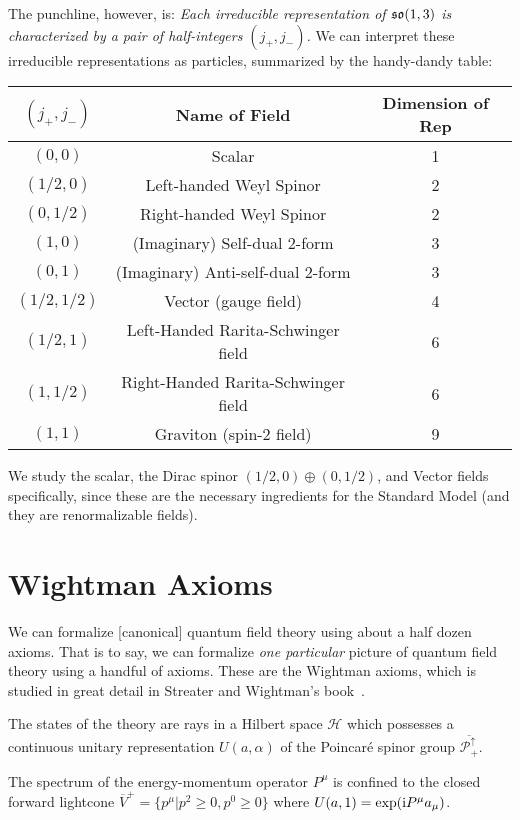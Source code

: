 The punchline, however, is: \textit{Each irreducible representation of $\mathfrak{so}(1,3)$
is characterized by a pair of half-integers $(j_{+}, j_{-})$.} We can
interpret these irreducible representations as particles, summarized by
the handy-dandy table:

\begin{center}
\begin{tabular}{c|c|c}
  $(j_{+}, j_{-})$ & Name of Field & Dimension of Rep \\\hline
  $(0, 0)$ &	Scalar  &	1\\
$(1/2, 0)$ & 	Left-handed Weyl Spinor &	2\\
$(0, 1/2)$ &	Right-handed Weyl Spinor &	2\\
$(1, 0)$ &	(Imaginary) Self-dual 2-form &	3\\
$(0, 1)$ &	(Imaginary) Anti-self-dual 2-form &	3\\
$(1/2, 1/2)$ &	Vector (gauge field) &	4\\
$(1/2, 1)$ & 	Left-Handed Rarita-Schwinger field &	6\\
$(1, 1/2)$ &	Right-Handed Rarita-Schwinger field &	6\\
$(1, 1)$ &	Graviton (spin-2 field) &	9
\end{tabular}
\end{center}

\M
We study the scalar, the Dirac spinor $(1/2, 0)\oplus(0, 1/2)$, and
Vector fields specifically, since these are the necessary ingredients
for the Standard Model (and they are renormalizable fields).

\section{Wightman Axioms}

\M
We can formalize [canonical] quantum field theory using about a half
dozen axioms. That is to say, we can formalize \emph{one particular}
picture of quantum field theory using a handful of axioms.
These are the Wightman axioms, which is studied in great detail in
Streater and Wightman's book~\cite{Streater:1989vi}.


\begin{axiom}
The states of the theory are rays in a Hilbert space $\mathcal{H}$ which
possesses a continuous unitary representation $U(a,\alpha)$ of the
Poincar\'e spinor group $\overline{\mathscr{P}^{\uparrow}_{+}}$.
\end{axiom}

\begin{axiom}
The spectrum of the energy-momentum operator $P^{\mu}$ is confined to
the closed forward lightcone $\overline{V}^{+}=\{p^{\mu}|p^{2}\geq0,p^{0}\geq0\}$
where $U(a,1)=\exp(\mathrm{i} P^{\mu}a_{\mu})$.
\end{axiom}

